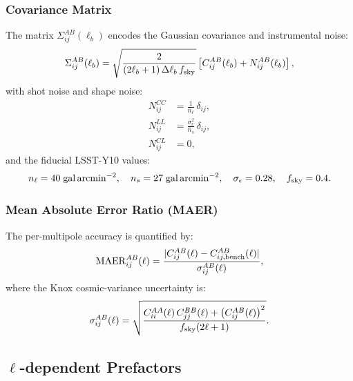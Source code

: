 \subsubsection{Covariance Matrix}

The matrix $\Sigma^{AB}_{ij}(\ell_b)$ encodes the Gaussian covariance and
instrumental noise:
\begin{equation}
    \Sigma^{AB}_{ij}(\ell_b) = \sqrt{\frac{2}{(2\ell_b+1)\,\Delta\ell_b\,f_{\rm sky}}}
    \left[C^{AB}_{ij}(\ell_b) + N^{AB}_{ij}(\ell_b)\right],
    \label{eq:Sigma}
\end{equation}
with shot noise and shape noise:
\begin{align}
    N^{CC}_{ij} &= \frac{1}{\bar{n}_\ell}\,\delta_{ij}, \\
    N^{LL}_{ij} &= \frac{\sigma_\epsilon^2}{\bar{n}_s}\,\delta_{ij}, \\
    N^{CL}_{ij} &= 0,
\end{align}
and the fiducial LSST-Y10 values:
\begin{equation}
    n_\ell = 40\;\mathrm{gal\,arcmin^{-2}}, \quad
    n_s = 27\;\mathrm{gal\,arcmin^{-2}}, \quad
    \sigma_\epsilon = 0.28, \quad
    f_{\rm sky} = 0.4.
\end{equation}

\subsubsection{Mean Absolute Error Ratio (MAER)}

The per-multipole accuracy is quantified by:
\begin{equation}
    \mathrm{MAER}^{AB}_{ij}(\ell) =
    \frac{|C^{AB}_{ij}(\ell) - C^{AB}_{ij,\rm bench}(\ell)|}{\sigma^{AB}_{ij}(\ell)},
    \label{eq:MAER}
\end{equation}
where the Knox cosmic-variance uncertainty is:
\begin{equation}
    \sigma^{AB}_{ij}(\ell) =
    \sqrt{\frac{C^{AA}_{ii}(\ell)\,C^{BB}_{jj}(\ell)
    + \bigl(C^{AB}_{ij}(\ell)\bigr)^2}{f_{\rm sky}(2\ell+1)}}.
    \label{eq:Knox}
\end{equation}

\subsection{$\ell$-dependent Prefactors}

